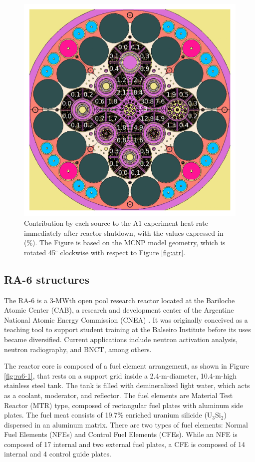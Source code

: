 \documentclass{style/nseJournal}
\begin{document}
\begin{figure}[htbp!] %
    \centering
    \includegraphics[width=0.90\linewidth]{figures/atr_contributions}
    \hfill
    \caption{Contribution by each source to the A1 experiment heat rate immediately after reactor shutdown, with the values expressed in (\%). The Figure is based on the MCNP model geometry, which is rotated 45$^{\circ}$ clockwise with respect to Figure \ref{fig:atr}.}
    \label{fig:atr-contrib}
\end{figure}


\subsection{RA-6 structures}

The RA-6 is a 3-MWth open pool research reactor located at the Bariloche Atomic Center (CAB), a research and development center of the Argentine National Atomic Energy Commission (CNEA) \cite{ICSBEP}.
It was originally conceived as a teaching tool to support student training at the Balseiro Institute before its uses became diversified.
Current applications include neutron activation analysis, neutron radiography, and \gls*{BNCT}, among others.

The reactor core is composed of a fuel element arrangement, as shown in Figure \ref{fig:ra6-1}, that rests on a support grid inside a 2.4-m-diameter, 10.4-m-high stainless steel tank.
The tank is filled with demineralized light water, which acts as a coolant, moderator, and reflector.
The fuel elements are Material Test Reactor (MTR) type, composed of rectangular fuel plates with aluminum side plates.
The fuel meat consists of 19.7\% enriched uranium silicide (U$_3$Si$_2$) dispersed in an aluminum matrix.
There are two types of fuel elements: Normal Fuel Elements (NFEs) and Control Fuel Elements (CFEs).
While an NFE is composed of 17 internal and two external fuel plates, a CFE is composed of 14 internal and 4 control guide plates.
\end{document}
